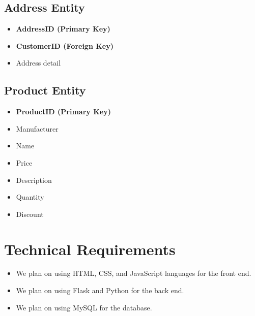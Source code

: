 \documentclass[12pt]{article}
\begin{document}
\subsection*{Address Entity}
\begin{itemize}
    \item \textbf{AddressID (Primary Key)}
    \item \textbf{CustomerID (Foreign Key)}
    \item Address detail

\end{itemize}

\subsection*{Product Entity}
\begin{itemize}
    \item \textbf{ProductID (Primary Key)}
    \item Manufacturer
    \item Name
    \item Price
    \item Description
    \item Quantity
    \item Discount

\end{itemize}

\section*{Technical Requirements}
\begin{itemize}
    \item We plan on using HTML, CSS, and JavaScript languages for the front end.
    \item We plan on using Flask and Python for the back end.
    \item We plan on using MySQL for the database.

\end{itemize}
\end{document}
